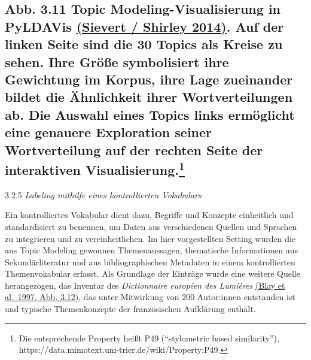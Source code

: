 \documentclass[
  12pt,
  letterpaper,
  DIV=11,
  numbers=noendperiod]{scrreprt}
\begin{document}
\subsection[\textbf{Abb. 3.11} Topic Modeling-Visualisierung in PyLDAVis
\href{https://www.zotero.org/google-docs/?DRXX4A}{(Sievert / Shirley
2014)}. Auf der linken Seite sind die 30 Topics als Kreise zu sehen.
Ihre Größe symbolisiert ihre Gewichtung im Korpus, ihre Lage zueinander
bildet die Ähnlichkeit ihrer Wortverteilungen ab. Die Auswahl eines
Topics links ermöglicht eine genauere Exploration seiner Wortverteilung
auf der rechten Seite der interaktiven
Visualisierung.]{\texorpdfstring{\textbf{Abb. 3.11} Topic
Modeling-Visualisierung in PyLDAVis
\href{https://www.zotero.org/google-docs/?DRXX4A}{(Sievert / Shirley
2014)}. Auf der linken Seite sind die 30 Topics als Kreise zu sehen.
Ihre Größe symbolisiert ihre Gewichtung im Korpus, ihre Lage zueinander
bildet die Ähnlichkeit ihrer Wortverteilungen ab. Die Auswahl eines
Topics links ermöglicht eine genauere Exploration seiner Wortverteilung
auf der rechten Seite der interaktiven
Visualisierung.\footnote{Die entsprechende Property heißt P49
  (``stylometric based similarity''),
  https://data.mimotext.uni-trier.de/wiki/Property:P49.}}{Abb. 3.11 Topic Modeling-Visualisierung in PyLDAVis (Sievert / Shirley 2014). Auf der linken Seite sind die 30 Topics als Kreise zu sehen. Ihre Größe symbolisiert ihre Gewichtung im Korpus, ihre Lage zueinander bildet die Ähnlichkeit ihrer Wortverteilungen ab. Die Auswahl eines Topics links ermöglicht eine genauere Exploration seiner Wortverteilung auf der rechten Seite der interaktiven Visualisierung.}}\label{abb.-3.11-topic-modeling-visualisierung-in-pyldavis-sievert-shirley-2014.-auf-der-linken-seite-sind-die-30-topics-als-kreise-zu-sehen.-ihre-gruxf6uxdfe-symbolisiert-ihre-gewichtung-im-korpus-ihre-lage-zueinander-bildet-die-uxe4hnlichkeit-ihrer-wortverteilungen-ab.-die-auswahl-eines-topics-links-ermuxf6glicht-eine-genauere-exploration-seiner-wortverteilung-auf-der-rechten-seite-der-interaktiven-visualisierung.15}

3.2.5 \emph{Labeling mithilfe eines kontrollierten Vokabulars}

Ein kontrolliertes Vokabular dient dazu, Begriffe und Konzepte
einheitlich und standardisiert zu benennen, um Daten aus verschiedenen
Quellen und Sprachen zu integrieren und zu vereinheitlichen. Im hier
vorgestellten Setting wurden die aus Topic Modeling gewonnen
Themenaussagen, thematische Informationen aus Sekundärliteratur und aus
bibliographischen Metadaten in einem kontrollierten Themenvokabular
erfasst. Als Grundlage der Einträge wurde eine weitere Quelle
herangezogen, das Inventar des \emph{Dictionnaire européen des Lumières}
\href{https://www.zotero.org/google-docs/?XBmRh4}{(Blay et al.~1997,
Abb. 3.12)}, das unter Mitwirkung von 200 Autor:innen entstanden ist und
typische Themenkonzepte der französischen Aufklärung enthält.
\end{document}
